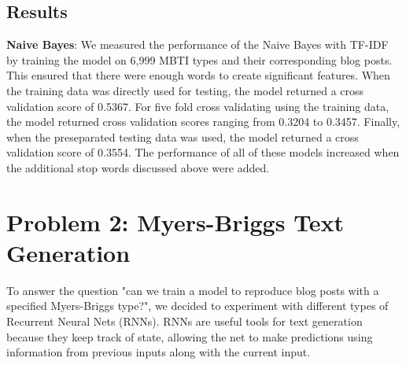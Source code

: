 \documentclass{article}
\begin{document}
\subsection{Results}
\textbf{Naive Bayes}: We measured the performance of the Naive Bayes with TF-IDF by training the model on 6,999 MBTI types and their corresponding blog posts. This ensured that there were enough words to create significant features. When the training data was directly used for testing, the model returned a cross validation score of 0.5367. For five fold cross validating using the training data, the model returned cross validation scores ranging from 0.3204 to 0.3457. Finally, when the preseparated testing data was used, the model returned a cross validation score of 0.3554. The performance of all of these models increased when the additional stop words discussed above were added. 

\section{Problem 2: Myers-Briggs Text Generation}
To answer the question "can we train a model to reproduce blog posts with a specified Myers-Briggs type?", we decided to experiment with different types of Recurrent Neural Nets (RNNs). RNNs are useful tools for text generation because they keep track of state, allowing the net to make predictions using information from previous inputs along with the current input.
\end{document}
